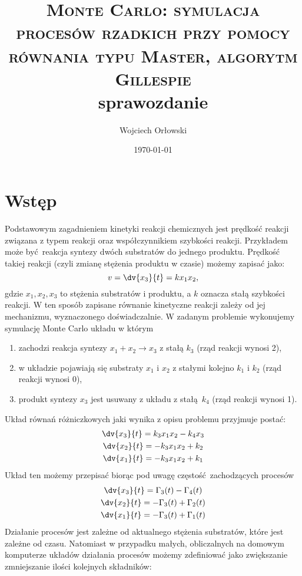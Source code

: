 \documentclass[a4paper,12pt]{article}
\author{Wojciech Orłowski}
\title{\textsc{Monte Carlo: symulacja procesów rzadkich przy pomocy równania
typu Master, algorytm Gillespie} \\ sprawozdanie}
\date{\today}
\begin{document}
\maketitle

\section*{Wstęp}

Podstawowym zagadnieniem kinetyki reakcji chemicznych jest prędkość reakcji związana z typem reakcji oraz współczynnikiem szybkości reakcji.
Przykładem może być reakcja syntezy dwóch substratów do jednego produktu. 
Prędkość takiej reakcji (czyli zmianę stężenia produktu w czasie) możemy zapisać jako:
\begin{equation}
	v = \dv{x_3}{t} = kx_1x_2,
\end{equation}
gdzie $x_1, x_2, x_3$ to stężenia substratów i produktu, a $k$ oznacza stałą szybkości reakcji. 
W ten sposób zapisane równanie kinetyczne reakcji zależy od jej mechanizmu, wyznaczonego doświadczalnie. 
W zadanym problemie wykonujemy symulację Monte Carlo układu w którym
\begin{enumerate}
	\item zachodzi reakcja syntezy $x_1 + x_2 \rightarrow x_3$ z stałą $k_3$ (rząd reakcji wynosi 2),
	\item w układzie pojawiają się substraty $x_1$ i $x_2$ z stałymi kolejno $k_1$ i $k_2$ (rząd reakcji wynosi 0),
	\item produkt syntezy $x_3$ jest usuwany z układu z stałą $k_4$ (rząd reakcji wynosi 1).
\end{enumerate}
Układ równań różniczkowych jaki wynika z opisu problemu przyjmuje postać:
\begin{gather}
	\dv{x_3}{t} = k_3x_1x_2 - k_4x_3 \\
	\dv{x_2}{t} = -k_3x_1x_2 + k_2 \\
	\dv{x_1}{t} = -k_3x_1x_2 + k_1 
\end{gather}
Układ ten możemy przepisać biorąc pod uwagę częstość zachodzących procesów
\begin{gather}
	\dv{x_3}{t} = \Gamma_3(t) - \Gamma_4(t) \\
	\dv{x_2}{t} = -\Gamma_3(t) + \Gamma_2(t) \\
	\dv{x_1}{t} = -\Gamma_3(t) + \Gamma_1(t) 
\end{gather}
Działanie procesów jest zależne od aktualnego stężenia substratów, które jest zależne od czasu.
Natomiast w przypadku małych, obliczalnych na domowym komputerze układów działania procesów możemy zdefiniować jako zwiększanie zmniejszanie ilości kolejnych składników:
\end{document}
